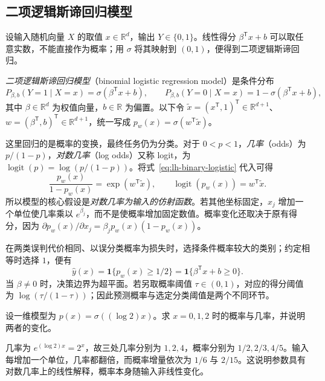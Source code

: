 \subsection{二项逻辑斯谛回归模型}
\label{subsec:lh-binary-logistic}

设输入随机向量 $X$ 的取值 $x\in\mathbb R^d$，输出 $Y\in\{0,1\}$。线性得分 $\beta^{\mathsf T}x+b$ 可以取任意实数，不能直接作为概率；用 $\sigma$ 将其映射到 $(0,1)$，便得到二项逻辑斯谛回归。

\begin{definition}[二项逻辑斯谛回归]
\label{def:lh-binary-logistic}
\emph{二项逻辑斯谛回归模型}（binomial logistic regression model）是条件分布
\begin{equation}
P_{\beta,b}(Y=1\mid X=x)=\sigma(\beta^{\mathsf T}x+b),\qquad
P_{\beta,b}(Y=0\mid X=x)=1-\sigma(\beta^{\mathsf T}x+b),
\label{eq:lh-binary-logistic}
\end{equation}
其中 $\beta\in\mathbb R^d$ 为权值向量，$b\in\mathbb R$ 为偏置。以下令 $\widetilde x=(x^{\mathsf T},1)^{\mathsf T}\in\mathbb R^{d+1}$、$w=(\beta^{\mathsf T},b)^{\mathsf T}\in\mathbb R^{d+1}$，统一写成 $p_w(x)=\sigma(w^{\mathsf T}\widetilde x)$。
\end{definition}

这里回归的是概率的变换，最终任务仍为分类。对于 $0<p<1$，\emph{几率}（odds）为 $p/(1-p)$，\emph{对数几率}（log odds）又称 logit，为 $\operatorname{logit}(p)=\log(p/(1-p))$。将式~\eqref{eq:lh-binary-logistic} 代入可得
\begin{equation}
\frac{p_w(x)}{1-p_w(x)}=\exp(w^{\mathsf T}\widetilde x),\qquad
\operatorname{logit}(p_w(x))=w^{\mathsf T}\widetilde x.
\label{eq:lh-log-odds}
\end{equation}
所以模型的核心假设是\emph{对数几率为输入的仿射函数}。若其他坐标固定，$x_j$ 增加一个单位使几率乘以 $e^{\beta_j}$，而不是使概率增加固定数值。概率变化还取决于原有得分，因为 $\partial p_w(x)/\partial x_j=\beta_jp_w(x)(1-p_w(x))$。

在两类误判代价相同、以误分类概率为损失时，选择条件概率较大的类别；约定相等时选择 $1$，便有
\begin{equation}
\widehat y(x)=\mathbf 1\{p_w(x)\geq 1/2\}
=\mathbf 1\{\beta^{\mathsf T}x+b\geq 0\}.
\label{eq:lh-logistic-decision}
\end{equation}
当 $\beta\ne0$ 时，决策边界为超平面。若另取概率阈值 $\tau\in(0,1)$，对应的得分阈值为 $\log(\tau/(1-\tau))$；因此预测概率与选定分类阈值是两个不同环节。

\begin{example}
\label{ex:lh-logistic-odds}
设一维模型为 $p(x)=\sigma((\log 2)x)$。求 $x=0,1,2$ 时的概率与几率，并说明两者的变化。
\end{example}
\begin{solve}
几率为 $e^{(\log2)x}=2^x$，故三处几率分别为 $1,2,4$，概率分别为 $1/2,2/3,4/5$。输入每增加一个单位，几率都翻倍，而概率增量依次为 $1/6$ 与 $2/15$。这说明参数具有对数几率上的线性解释，概率本身随输入非线性变化。
\end{solve}

